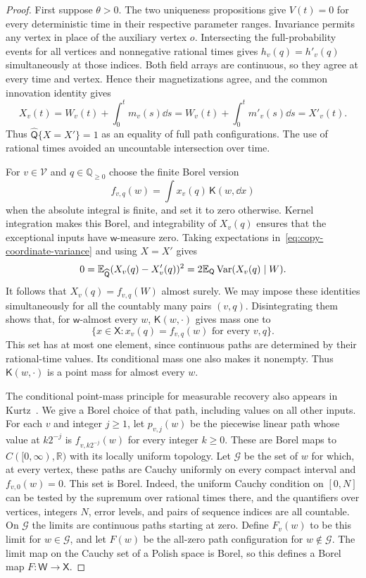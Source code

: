 \begin{proof}
First suppose $\theta>0$. The two uniqueness propositions give
$V(t)=0$ for every deterministic time in their respective parameter
ranges. Invariance permits any vertex in place of the auxiliary
vertex $o$. Intersecting the full-probability events for all vertices
and nonnegative rational times gives
$h_v(q)=h'_v(q)$ simultaneously at those indices. Both field arrays
are continuous, so they agree at every time and vertex. Hence their
magnetizations agree, and the common innovation identity gives
\[
 X_v(t)=W_v(t)+\int_0^t m_v(s)\dd s
       =W_v(t)+\int_0^t m'_v(s)\dd s=X'_v(t).
\]
Thus $\widehat{\mathsf Q}\{X=X'\}=1$ as an equality of full path
configurations. The use of rational times avoided an uncountable
intersection over time.

For $v\in\mathcal V$ and $q\in\mathbb Q_{\ge0}$ choose the finite
Borel version
\[
 f_{v,q}(w)=\int x_v(q)\,\mathsf K(w,\dd x)
\]
when the absolute integral is finite, and set it to zero otherwise.
Kernel integration makes this Borel, and integrability of $X_v(q)$
ensures that the exceptional inputs have $\mathsf w$-measure zero.
Taking expectations in~\eqref{eq:copy-coordinate-variance} and using
$X=X'$ gives
\[
 0=\mathbb E_{\widehat{\mathsf Q}}(X_v(q)-X'_v(q))^2
   =2\mathbb E_{\mathsf Q}\operatorname{Var}(X_v(q)\mid W).
\]
It follows that $X_v(q)=f_{v,q}(W)$ almost surely. We may impose
these identities simultaneously for all the countably many pairs
$(v,q)$. Disintegrating them shows that, for $\mathsf w$-almost
every $w$, $\mathsf K(w,\cdot)$ gives mass one to
\[
 \{x\in\mathsf X:x_v(q)=f_{v,q}(w)
                 \text{ for every }v,q\}.
\]
This set has at most one element, since continuous paths are
determined by their rational-time values. Its conditional mass one
also makes it nonempty. Thus $\mathsf K(w,\cdot)$ is a point mass
for almost every $w$.

The conditional point-mass principle for measurable recovery also
appears in Kurtz~\cite[Lemma~1.3 in arXiv:1305.6747v2]{Kurtz2014}.
We give a Borel choice of that path, including values on all other
inputs. For each $v$ and integer $j\ge1$, let $p_{v,j}(w)$ be the
piecewise linear path whose value at $k2^{-j}$ is
$f_{v,k2^{-j}}(w)$ for every integer $k\ge0$. These are Borel maps
to $C([0,\infty),\mathbb R)$ with its locally uniform topology.
Let $\mathcal G$ be the set of $w$ for which, at every vertex, these
paths are Cauchy uniformly on every compact interval and
$f_{v,0}(w)=0$. This set is Borel. Indeed, the uniform Cauchy
condition on $[0,N]$ can be tested by the supremum over rational
times there, and the quantifiers over vertices, integers $N$, error
levels, and pairs of sequence indices are all countable. On
$\mathcal G$ the limits are continuous paths starting at zero.
Define $F_v(w)$ to be this limit for $w\in\mathcal G$, and let
$F(w)$ be the all-zero path configuration for $w\notin\mathcal G$.
The limit map on the Cauchy set of a Polish space is Borel, so this
defines a Borel map $F:\mathsf W\to\mathsf X$.


\end{proof}
